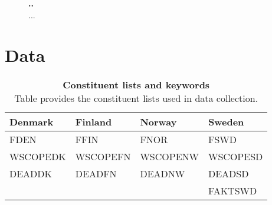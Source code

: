 \documentclass{article}
\begin{document}
\begin{figure}[h]
\centering
\caption[Variable importance]{\textbf{..}\\ ...}

\label{plot:combined_VI}
\end{figure}

\appendix
\section{Data}
\renewcommand{\thefigure}{A.\arabic{figure}}
\setcounter{figure}{0}
\renewcommand{\thetable}{A.\arabic{table}}
\setcounter{table}{0}

\begin{table}[h] 
\small
\caption[Constituent lists and keywords]{\textbf{Constituent lists and keywords}\\ Table provides the constituent lists used in data collection.}
 \label{table:constituteLists}
\centering
\begin{tabularx}{\textwidth}{X X X X}
\toprule
Denmark & Finland & Norway & Sweden \\
\midrule
FDEN 		&  FFIN		& FNOR		& FSWD\\
WSCOPEDK & WSCOPEFN & WSCOPENW& WSCOPESD\\
DEADDK 	&   DEADFN 	& DEADNW 	& DEADSD\\
& & & FAKTSWD\\
 \bottomrule
 \end{tabularx}
 \end{table} 
\end{document}

